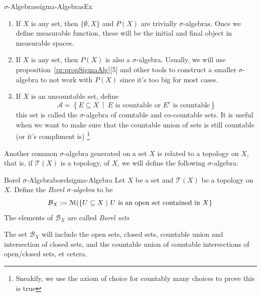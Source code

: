 \documentclass[oneside]{book}
\newcommand{\CA}{\mathcal{A}}
\newcommand{\MM}{\EuScript{M}}
\newcommand{\BB}{\mathcal{B}}
\newcommand{\TT}{\mathcal{T}}
\newcommand{\sse}{\subseteq}
\newcommand{\set}[2]{\left\{#1 \ \middle|\ #2\right\}}
\begin{document}
\begin{example}{$\sigma$-Algebras}{sigma-AlgebrasEx}
	\begin{enumerate}
		\item If $X$ is any set, then $\{\emptyset, X\}$ and $P(X)$ are trivially $\sigma$-algebras. Once we define
			measurable function, these will be the initial and final object in measurable spaces. 
		\item If $X$ is any set, then $P(X)$ is also a $\sigma$-algebra. Usually, we will use
			proposition~\ref{pr:propSigmaAlg}[5] and other tools to construct a smaller $\sigma$-algebra to not work with $P(X)$ since
			it's too big for most cases. 
		\item  If $X$ is an uncountable set, define
			\[
				\CA = \set{E \sse X}{\text{$E$ is countable or $E^c$ is countable}}
			\]
			this set is called the $\sigma$-algebra of countable and co-countable sets. It is useful when we want to make
			sure that the countable union of sets is still countable (or it's compliment is) \footnote{Sneakily, we use
			the axiom of choice for countably many choices to prove this is true}
	\end{enumerate}
\end{example} 

Another common $\sigma$-algebra generated on a set $X$ is related to a topology on $X$, that is, if $\TT(X)$ is
a topology, of $X$, we will define the following $\sigma$-algebra:
\begin{defn}{Borel $\sigma$-Algebra}{borelsigma-Algebra}
	Let $X$ be a set and $\TT(X)$ be a topology on $X$. Define the \emph{Borel $\sigma$-algebra} to be
	\[
		\BB_X := \MM(\set{U \sse X}{\text{$U$ is an open set contained in $X$}}
	\]
	The elements of $\BB_X$ are called \emph{Borel sets}
\end{defn}

The set $\BB_X$ will include the open sets, closed sets, countable union and intersection of closed sets, and the
countable union of countable intersections of open/closed sets, et cetera. 
\end{document}

